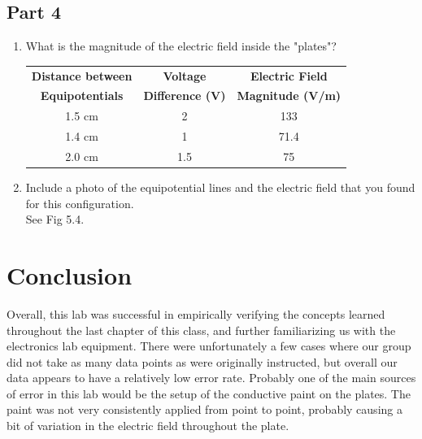 \documentclass[titlepage]{article}
\begin{document}
		\subsection{Part 4}
		\begin{enumerate}
			\item What is the magnitude of the electric field inside the "plates"?\\
				\FloatBarrier
				\begin{center}
				\begin{table}[hbt!]
			\begin{tabular}{c|c|c}
				\textbf{Distance between} & \textbf{Voltage} & \textbf{Electric Field} \\
				\textbf{Equipotentials} & \textbf{Difference (V)} & \textbf{Magnitude (V/m)}\\
				\hline
				1.5 cm & 2 & 133\\
				1.4 cm & 1 & 71.4    \\
				2.0 cm & 1.5 & 75  \\
			\end{tabular}
			\end{table}
			\end{center}
			\FloatBarrier
			\item Include a photo of the equipotential lines and the electric field that you found for this configuration.\\
			See Fig 5.4.
		\end{enumerate}
	\section{Conclusion}
    Overall, this lab was successful in empirically verifying the concepts learned throughout the last chapter of this class, and further familiarizing us with the electronics lab equipment. There were unfortunately a few cases where our group did not take as many data points as were originally instructed, but overall our data appears to have a relatively low error rate. Probably one of the main sources of error in this lab would be the setup of the conductive paint on the plates. The paint was not very consistently applied from point to point, probably causing a bit of variation in the electric field throughout the plate. 


	
	
\end{document}
